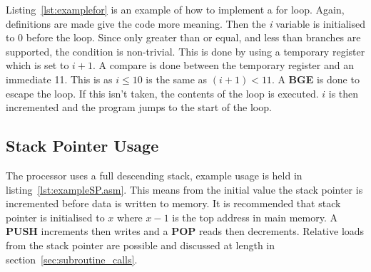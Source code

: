 \begin{minipage}{\linewidth}

\end{minipage}

Listing~\ref{lst:examplefor} is an example of how to implement a for loop. 
Again, definitions are made give the code more meaning. 
Then the \textit{i} variable is initialised to 0 before the loop. 
Since only greater than or equal, and less than branches are supported, the condition is non-trivial.
This is done by using a temporary register which is set to $i + 1$. 
A compare is done between the temporary register and an immediate 11.
This is as $i \leq 10$ is the same as $(i+1) < 11$. 
A \textbf{BGE} is done to escape the loop. 
If this isn't taken, the contents of the loop is executed.
$i$ is then incremented and the program jumps to the start of the loop. 



\begin{minipage}{\linewidth}

\end{minipage}



\subsection{Stack Pointer Usage}

The \samurai{} processor uses a full descending stack, example usage is held in listing~\ref{lst:exampleSP.asm}.
This means from the initial value the stack pointer is incremented before data is written to memory.
It is recommended that stack pointer is initialised to $x$ where $x-1$ is the top address in main memory. 
A \textbf{PUSH} increments then writes and a \textbf{POP} reads then decrements.
Relative loads from the stack pointer are possible and discussed at length in section~\ref{sec:subroutine_calls}.

\begin{minipage}{\linewidth}

\end{minipage}

